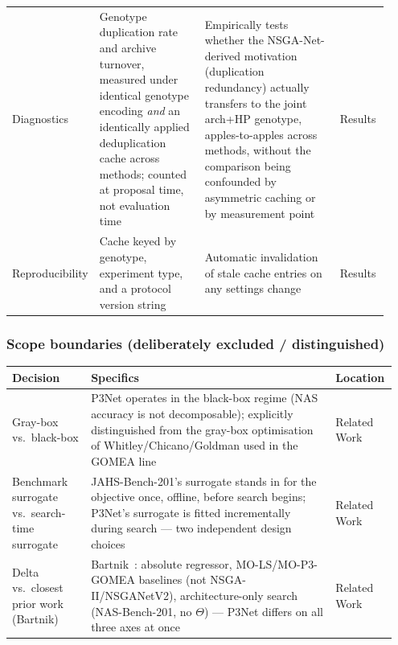 \begin{longtable}{p{0.16\linewidth} p{0.28\linewidth} p{0.36\linewidth} p{0.13\linewidth}}
Diagnostics & Genotype duplication rate and archive turnover, measured under identical genotype encoding \emph{and} an identically applied deduplication cache across methods; counted at proposal time, not evaluation time & Empirically tests whether the NSGA-Net-derived motivation (duplication redundancy) actually transfers to the joint arch+HP genotype, apples-to-apples across methods, without the comparison being confounded by asymmetric caching or by measurement point & Results \\
Reproducibility & Cache keyed by genotype, experiment type, and a protocol version string & Automatic invalidation of stale cache entries on any settings change & Results \\
\bottomrule
\end{longtable}

\subsubsection*{Scope boundaries (deliberately excluded / distinguished)}
\begin{longtable}{p{0.20\linewidth} p{0.62\linewidth} p{0.13\linewidth}}
\toprule
\textbf{Decision} & \textbf{Specifics} & \textbf{Location} \\
\midrule
\endhead
Gray-box vs.\ black-box & P3Net operates in the black-box regime (NAS accuracy is not decomposable); explicitly distinguished from the gray-box optimisation of Whitley/Chicano/Goldman used in the GOMEA line & Related Work \\
Benchmark surrogate vs.\ search-time surrogate & JAHS-Bench-201's surrogate stands in for the objective once, offline, before search begins; P3Net's surrogate is fitted incrementally during search --- two independent design choices & Related Work \\
Delta vs.\ closest prior work (Bartnik) & Bartnik~\citep{bartnik2026evolutionary}: absolute regressor, MO-LS/MO-P3-GOMEA baselines (not NSGA-II/NSGANetV2), architecture-only search (NAS-Bench-201, no $\Theta$) --- P3Net differs on all three axes at once & Related Work \\
\bottomrule
\end{longtable}

